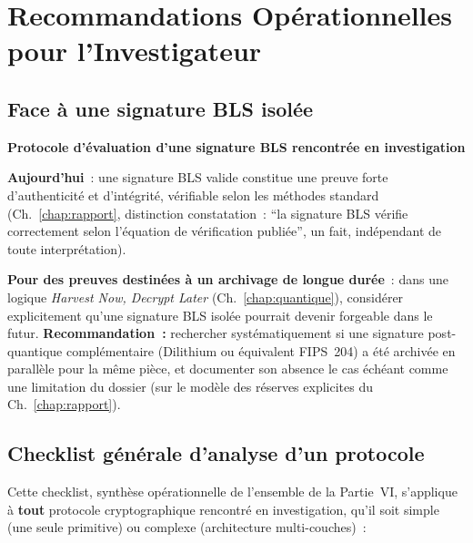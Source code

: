 \section{Recommandations Opérationnelles pour l'Investigateur}
\label{sec:recommandations-investigateur}

\subsection{Face à une signature BLS isolée}

\begin{boxPNC}
\textbf{Protocole d'évaluation d'une signature BLS rencontrée en
investigation}

\textbf{Aujourd'hui}~: une signature BLS valide constitue une preuve
forte d'authenticité et d'intégrité, vérifiable selon les méthodes
standard (Ch.~\ref{chap:rapport}, distinction constatation~:
``la signature BLS vérifie correctement selon l'équation de
vérification publiée'', un fait, indépendant de toute
interprétation).

\textbf{Pour des preuves destinées à un archivage de longue durée}~:
dans une logique \textit{Harvest Now, Decrypt Later}
(Ch.~\ref{chap:quantique}), considérer explicitement qu'une
signature BLS isolée pourrait devenir forgeable dans le futur.
\textbf{Recommandation~:} rechercher systématiquement si une
signature post-quantique complémentaire (Dilithium ou équivalent
FIPS~204) a été archivée en parallèle pour la même pièce, et
documenter son absence le cas échéant comme une limitation du
dossier (sur le modèle des réserves explicites du
Ch.~\ref{chap:rapport}).
\end{boxPNC}

\subsection{Checklist générale d'analyse d'un protocole}

Cette checklist, synthèse opérationnelle de l'ensemble de la
Partie~VI, s'applique à \textbf{tout} protocole cryptographique
rencontré en investigation, qu'il soit simple (une seule primitive)
ou complexe (architecture multi-couches)~:

